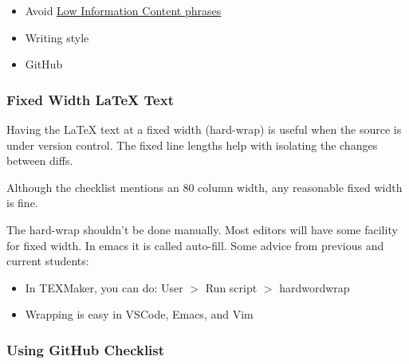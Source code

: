 \documentclass[12pt]{article}
\begin{document}
\begin{itemize}
\item Avoid
\href{https://www.brafton.com/blog/content-writing/anti-fluff-content-writing/}
{Low Information Content phrases}


\item Writing style
  
\item GitHub

\end{itemize}

\subsubsection*{Fixed Width \LaTeX{} Text}

Having the \LaTeX{} text at a fixed width (hard-wrap) is useful when the source
is under version control.  The fixed line lengths help with isolating the
changes between diffs.

Although the checklist mentions an 80 column width, any reasonable fixed width
is fine.

The hard-wrap shouldn't be done manually.  Most editors will have some facility
for fixed width.  In emacs it is called auto-fill.  Some advice from previous
and current students:

\begin{itemize}
\item In TEXMaker, you can do: User $>$ Run script $>$ hardwordwrap
\item Wrapping is easy in VSCode, Emacs, and Vim
\end{itemize}

\subsubsection*{Using GitHub Checklist}
\end{document}
